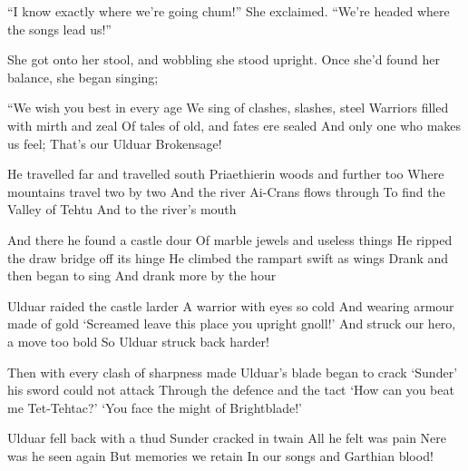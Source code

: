 \documentclass[12pt, a4paper]{book}
\begin{document}
``I know exactly where we're going chum!'' She exclaimed. ``We're headed where the songs lead us!''

She got onto her stool, and wobbling she stood upright. Once she'd found her balance, she began singing;


\begin{poem}
\begin{stanza}
``We wish you best in every age\verseline
We sing of clashes, slashes, steel\verseline
Warriors filled with mirth and zeal\verseline
Of tales of old, and fates ere sealed\verseline
And only one who makes us feel;\verseline
That's our Ulduar Brokensage!
\end{stanza}
\begin{stanza}
He travelled far and travelled south\verseline
Priaethierin woods and further too\verseline
Where mountains travel two by two\verseline
And the river Ai-Crans flows through\verseline
To find the Valley of Tehtu\verseline
And to the river's mouth
\end{stanza}
\begin{stanza}
And there he found a castle dour\verseline
Of marble jewels and useless things\verseline
He ripped the draw bridge off its hinge\verseline
He climbed the rampart swift as wings\verseline
Drank and then began to sing\verseline
And drank more by the hour
\end{stanza}
\begin{stanza}
Ulduar raided the castle larder\verseline
A warrior with eyes so cold\verseline
And wearing armour made of gold\verseline
`Screamed leave this place you upright gnoll!'\verseline
And struck our hero, a move too bold\verseline
So Ulduar struck back harder!
\end{stanza}
\begin{stanza}
Then with every clash of sharpness made\verseline
Ulduar's blade began to crack\verseline
`Sunder' his sword could not attack\verseline
Through the defence and the tact\verseline
`How can you beat me Tet-Tehtac?'\verseline
`You face the might of Brightblade!'
\end{stanza}
\begin{stanza}
Ulduar fell back with a thud\verseline
Sunder cracked in twain\verseline
All he felt was pain\verseline
Nere was he seen again\verseline
But memories we retain\verseline
In our songs and Garthian blood!
\end{stanza}
\end{poem}
\end{document}
